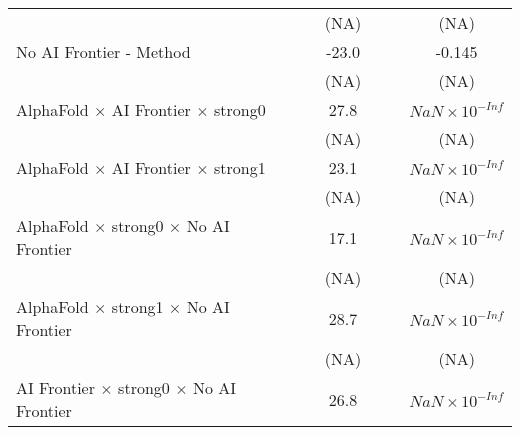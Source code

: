 \begin{tabular}{lcccccc}
                                                                              &                        &       & (NA)   &                        &                        & (NA)\\   
   No AI Frontier - Method                                                    &                        &       & -23.0  &                        &                        & -0.145\\   
                                                                              &                        &       & (NA)   &                        &                        & (NA)\\   
   AlphaFold $\times$ AI Frontier $\times$ strong0                            &                        &       & 27.8   &                        &                        & $NaN\times 10^{-Inf}$\\    
                                                                              &                        &       & (NA)   &                        &                        & (NA)\\   
   AlphaFold $\times$ AI Frontier $\times$ strong1                            &                        &       & 23.1   &                        &                        & $NaN\times 10^{-Inf}$\\    
                                                                              &                        &       & (NA)   &                        &                        & (NA)\\   
   AlphaFold $\times$ strong0 $\times$ No AI Frontier                         &                        &       & 17.1   &                        &                        & $NaN\times 10^{-Inf}$\\    
                                                                              &                        &       & (NA)   &                        &                        & (NA)\\   
   AlphaFold $\times$ strong1 $\times$ No AI Frontier                         &                        &       & 28.7   &                        &                        & $NaN\times 10^{-Inf}$\\    
                                                                              &                        &       & (NA)   &                        &                        & (NA)\\   
   AI Frontier $\times$ strong0 $\times$ No AI Frontier                       &                        &       & 26.8   &                        &                        & $NaN\times 10^{-Inf}$\\    

\end{tabular}
